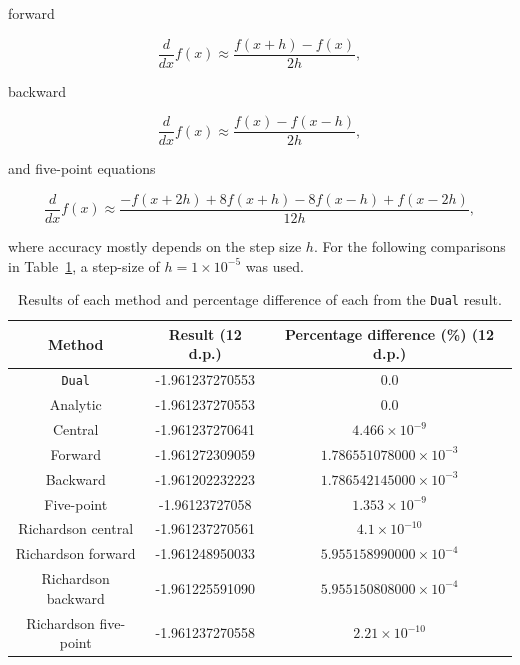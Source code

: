 \documentclass[11pt,a4paper]{article}
\begin{document}
forward \citep{numericaldiff}

\begin{equation}
    \frac{d}{dx} f(x) \approx \frac{f(x+h) - f(x)}{2h},
\end{equation}

backward \citep{numericaldiff}

\begin{equation}
    \frac{d}{dx} f(x) \approx \frac{f(x) - f(x-h)}{2h},
\end{equation}

and five-point \citep{sauer_numerical_2012} equations 

\begin{equation}
    \frac{d}{dx} f(x) \approx \frac{-f(x+2h) + 8 f(x+h) - 8 f(x-h) + f(x-2h)}{12h},
\end{equation}

where accuracy mostly depends on the step size $h$. For the following comparisons in Table~\ref{tab:diffs}, a step-size of $h=1 \times 10^{-5}$ was used.

\begin{table}
    \centering
    \begin{tabular}{c|c|c}
        Method & Result (12 d.p.) & Percentage difference (\%) (12 d.p.)\\
        \hline
        \texttt{Dual} & -1.961237270553 & $0.0$\\
        Analytic & -1.961237270553 & $0.0$\\
        \hline
        Central & -1.961237270641 & $4.466\times 10^{-9}$\\
        Forward & -1.961272309059 & $1.786551078000\times 10^{-3}$\\
        Backward & -1.961202232223 & $1.786542145000 \times 10^{-3}$\\
        Five-point & -1.96123727058 & $1.353\times 10^{-9}$\\
        \hline
        Richardson central & -1.961237270561 & $4.1\times 10^{-10}$\\
        Richardson forward & -1.961248950033 & $5.955158990000\times 10^{-4}$\\
        Richardson backward & -1.961225591090 & $5.955150808000\times 10^{-4}$\\
        Richardson five-point & -1.961237270558 & $2.21\times 10^{-10}$
    \end{tabular}
    \caption{Results of each method and percentage difference of each from the \texttt{Dual} result.}
    \label{tab:diffs}
\end{table}
\end{document}

